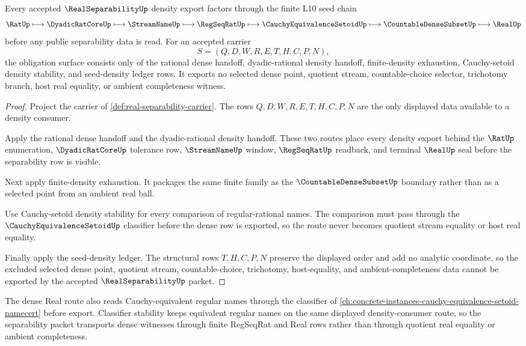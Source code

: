 \begin{theorem}
\label{thm:real-separability-obligation-closure-route}
Every accepted $\RealSeparabilityUp$ density export factors through the finite L10 seed chain
$$
\RatUp\longmapsto \DyadicRatCoreUp\longmapsto \StreamNameUp\longmapsto \RegSeqRatUp\longmapsto \CauchyEquivalenceSetoidUp\longmapsto \CountableDenseSubsetUp\longmapsto \RealUp
$$
before any public separability data is read. For an accepted carrier
$$
S=(Q,D,W,R,E,T,H,C,P,N),
$$
the obligation surface consists only of the rational dense handoff, dyadic-rational density handoff, finite-density exhaustion, Cauchy-setoid density stability, and seed-density ledger rows. It exports no selected dense point, quotient stream, countable-choice selector, trichotomy branch, host real equality, or ambient completeness witness.
\end{theorem}
\begin{proof}
Project the carrier of \autoref{def:real-separability-carrier}. The rows $Q,D,W,R,E,T,H,C,P,N$ are the only displayed data available to a density consumer.

Apply the rational dense handoff and the dyadic-rational density handoff. These two routes place every density export behind the $\RatUp$ enumeration, $\DyadicRatCoreUp$ tolerance row, $\StreamNameUp$ window, $\RegSeqRatUp$ readback, and terminal $\RealUp$ seal before the separability row is visible.

Next apply finite-density exhaustion. It packages the same finite family as the $\CountableDenseSubsetUp$ boundary rather than as a selected point from an ambient real ball.

Use Cauchy-setoid density stability for every comparison of regular-rational names. The comparison must pass through the $\CauchyEquivalenceSetoidUp$ classifier before the dense row is exported, so the route never becomes quotient stream equality or host real equality.

Finally apply the seed-density ledger. The structural rows $T,H,C,P,N$ preserve the displayed order and add no analytic coordinate, so the excluded selected dense point, quotient stream, countable-choice, trichotomy, host-equality, and ambient-completeness data cannot be exported by the accepted $\RealSeparabilityUp$ packet.
\end{proof}

The dense Real route also reads Cauchy-equivalent regular names through the classifier of \autoref{ch:concrete-instances-cauchy-equivalence-setoid-namecert} before export. Classifier stability keeps equivalent regular names on the same displayed density-consumer route, so the separability packet transports dense witnesses through finite RegSeqRat and Real rows rather than through quotient real equality or ambient completeness.
